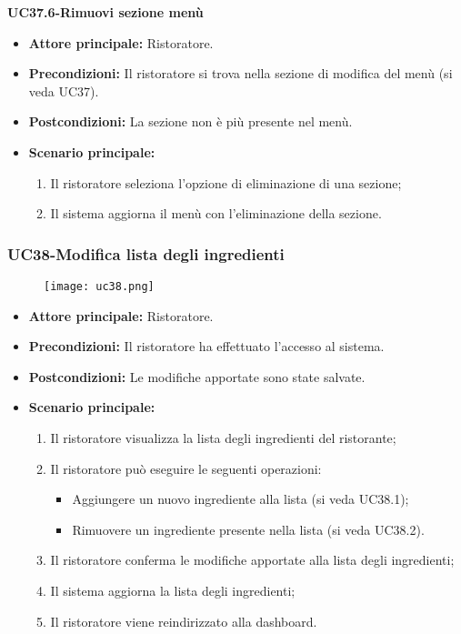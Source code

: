 \textbf{UC37.6-Rimuovi sezione menù}
\begin{itemize}
    \item \textbf{Attore principale:} Ristoratore.
    \item \textbf{Precondizioni:} Il ristoratore si trova nella sezione di modifica del menù (si veda UC37).
    \item \textbf{Postcondizioni:} La sezione non è più presente nel menù.
    \item \textbf{Scenario principale:}
    \begin{enumerate}
        \item Il ristoratore seleziona l'opzione di eliminazione di una sezione;
        \item Il sistema aggiorna il menù con l'eliminazione della sezione.
    \end{enumerate}
\end{itemize}

\subsubsection{UC38-Modifica lista degli ingredienti}
\begin{figure}[h] \texttt{[image: uc38.png]} \end{figure}
\begin{itemize}
    \item \textbf{Attore principale:} Ristoratore.
    \item \textbf{Precondizioni:} Il ristoratore ha effettuato l'accesso al sistema.
    \item \textbf{Postcondizioni:} Le modifiche apportate sono state salvate.
    \item \textbf{Scenario principale:}
    \begin{enumerate}
        \item Il ristoratore visualizza la lista degli ingredienti del ristorante;
        \item Il ristoratore può eseguire le seguenti operazioni:
        \begin{itemize}
           \item Aggiungere un nuovo ingrediente alla lista (si veda UC38.1);
           \item Rimuovere un ingrediente presente nella lista (si veda UC38.2).
        \end{itemize}
    \item Il ristoratore conferma le modifiche apportate alla lista degli ingredienti;
    \item Il sistema aggiorna la lista degli ingredienti;
    \item Il ristoratore viene reindirizzato alla dashboard.
    \end{enumerate}
\end{itemize}

